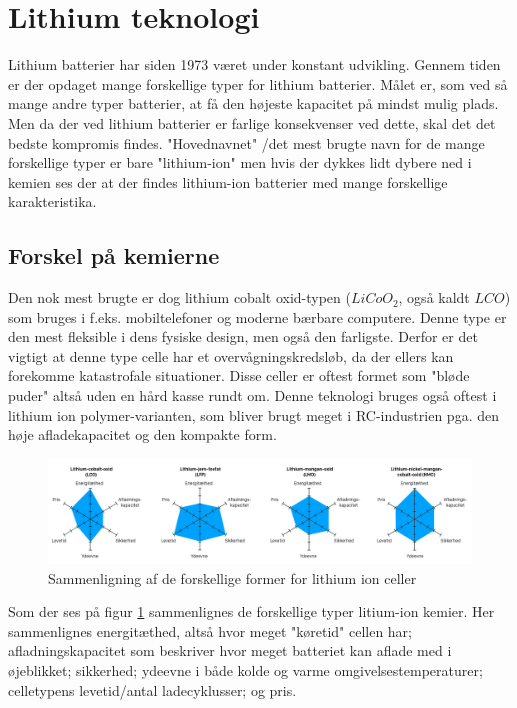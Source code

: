 \section{Lithium teknologi}
Lithium batterier har siden 1973 været under konstant udvikling. Gennem tiden er der opdaget mange forskellige typer for lithium batterier. Målet er, som ved så mange andre typer batterier, at få den højeste kapacitet på mindst mulig plads. Men da der ved lithium batterier er farlige konsekvenser ved dette, skal det det bedste kompromis findes. "Hovednavnet" \space /det mest brugte navn for de mange forskellige typer er bare "lithium-ion" \space men hvis der dykkes lidt dybere ned i kemien ses der at der findes lithium-ion batterier med mange forskellige karakteristika. 

\subsection{Forskel på kemierne}
Den nok mest brugte er dog lithium cobalt oxid-typen ($LiCoO_2$, også kaldt $LCO$) som bruges i f.eks. mobiltelefoner og moderne bærbare computere. Denne type er den mest fleksible i dens fysiske design, men også den farligste. Derfor er det vigtigt at denne type celle har et overvågningskredsløb, da der ellers kan forekomme katastrofale situationer. Disse celler er oftest formet som "bløde puder" \space \textemdash \space altså uden en hård kasse rundt om. Denne teknologi bruges også oftest i lithium ion polymer-varianten, som bliver brugt meget i RC-industrien pga. den høje afladekapacitet og den kompakte form.

\begin{figure}[h]
	\centering
	\includegraphics[width=15cm]{billeder/chemical-comparison.png}
	\caption{Sammenligning af de forskellige former for lithium ion celler\protect\footnotemark}
	\label{fig:lithium_variants_comparison}
\end{figure}

Som der ses på figur \ref{fig:lithium_variants_comparison} sammenlignes de forskellige typer litium-ion kemier. Her sammenlignes energitæthed, altså hvor meget "køretid" \space cellen har; afladningskapacitet som beskriver hvor meget batteriet kan aflade med i øjeblikket; sikkerhed; ydeevne i både kolde og varme omgivelsestemperaturer; celletypens levetid/antal ladecyklusser; og pris. \\

